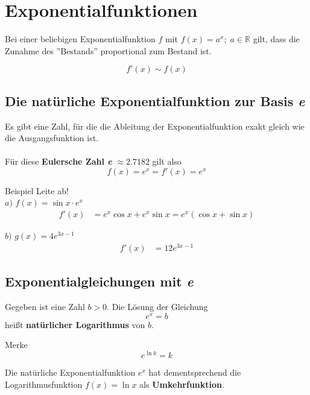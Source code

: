 \documentclass{article}
\begin{document}
\newpage

\section{Exponentialfunktionen}

Bei einer beliebigen Exponentialfunktion $f$ mit $f(x) = a^x;\; a \in \mathbb{R}$ gilt,
dass die Zunahme des ''Bestands'' proportional zum Bestand ist.

\[f'(x) \sim f(x)\]

\subsection{Die natürliche Exponentialfunktion zur Basis \emph{e}}

Es gibt eine Zahl, für die die Ableitung der Exponentialfunktion exakt gleich wie
die Ausgangsfunktion ist.
\\\\
Für diese \textbf{Eulersche Zahl \emph{e}} $\mathbf{\approx 2.7182}$ gilt also
\[f(x) = e^x = f'(x) = e^x\] 

\begin{boxx}[DarkBlue]{Beispiel}
    Leite ab! \\
    $a)$\hspace{3mm} $f(x) = \sin x \cdot e^x$
    \begin{align*}
        f'(x) &= e^x\cos x + e^x\sin x = e^x(\cos x + \sin x)
    \end{align*}

    $b)$\hspace{3mm} $g(x) = 4e^{3x-1}$
    \begin{align*}
        f'(x) &= 12e^{3x-1}
    \end{align*}
\end{boxx}

\subsection{Exponentialgleichungen mit \emph{e}}

Gegeben ist eine Zahl $b > 0$. Die Lösung der Gleichung
\[e^x = b\]
heißt \textbf{natürlicher Logarithmus} von $b$.

\begin{boxx}[LightGreen]{Merke}
    \[e^{\ln k} = k\]

    Die natürliche Exponentialfunktion $e^x$ hat dementsprechend 
    die Logarithmusfunktion $f(x) = \ln x$ als \textbf{Umkehrfunktion}.
\end{boxx}
\end{document}
